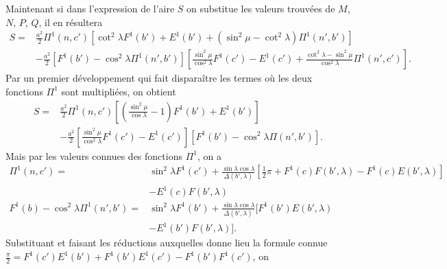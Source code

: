 \documentclass{article}
\begin{document}
Maintenant si dans l'expression de l'aire $S$ on substitue les valeurs trouvées de $M$, $N$, $P$, $Q$, il en résultera
\[ \begin{aligned} S={}&\frac{a^{2}}{2}\Pi^{1}(n,c')[\cot^{2}\lambda F^{1}(b')+E^{1}(b')+(\sin^{2}\mu-\cot^{2}\lambda)\Pi^{1}(n',b')]\\ &-\frac{a^{2}}{2}[F^{1}(b')-\cos^{2}\lambda\Pi^{1}(n',b')]\left[\frac{\sin^{2}\mu}{\cos^{2}\lambda}F^{1}(c')-E^{1}(c')+\frac{\cot^{2}\lambda-\sin^{2}\mu}{\cos^{2}\lambda}\Pi^{1}(n',c')\right]. \end{aligned} \]
Par un premier développement qui fait disparaître les termes où les deux fonctions $\Pi^{1}$ sont multipliées, on obtient
\[ \begin{aligned} S={}&\frac{a^{2}}{2}\Pi^{1}(n,c')\left[\left(\frac{\sin^{2}\mu}{\cos\lambda}-1\right)F^{1}(b')+E^{1}(b')\right]\\ &-\frac{a^{2}}{2}\left[\frac{\sin^{2}\mu}{\cos^{2}\lambda}F^{1}(c')-E^{1}(c')\right][F^{1}(b')-\cos^{2}\lambda\Pi(n',b')]. \end{aligned} \]
Mais par les valeurs connues des fonctions $\Pi^{1}$, on a
\[ \begin{aligned} \Pi^{1}(n,c')={}&\sin^{2}\lambda F^{1}(c')+\frac{\sin\lambda\cos\lambda}{\Delta(b',\lambda)}[\tfrac{1}{2}\pi+F^{1}(c)F(b',\lambda)-F^{1}(c)E(b',\lambda)]\\ &-E^{1}(c)F(b',\lambda)\\ F^{1}(b)-\cos^{2}\lambda\Pi^{1}(n',b')={}&\sin^{2}\lambda F^{1}(b')+\frac{\sin\lambda\cos\lambda}{\Delta(b',\lambda)}[F^{1}(b')E(b',\lambda)\\ &-E^{1}(b')F(b',\lambda)]. \end{aligned} \]
Substituant et faisant les réductions auxquelles donne lieu la formule connue $\frac{\pi}{2}=F^{1}(c')E^{1}(b')+F^{1}(b')E^{1}(c')-F^{1}(b')F^{1}(c')$, on
\end{document}
